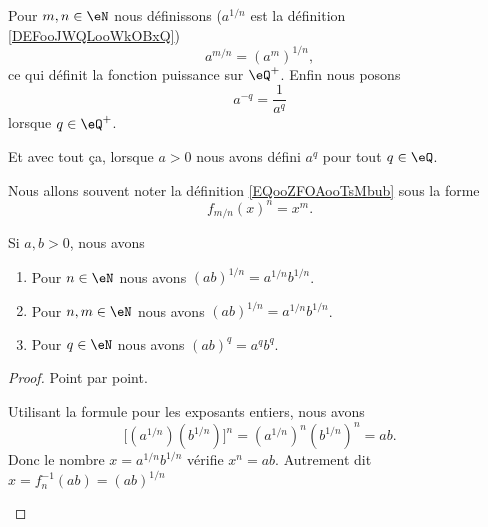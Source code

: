 \begin{definition}      \label{DEFooHXUFooOJTVXA}
	Pour \( m,n\in \eN\) nous définissons (\( a^{1/n}\) est la définition \ref{DEFooJWQLooWkOBxQ})
	\begin{equation}        \label{EQooZFOAooTsMbub}
		a^{m/n}=(a^m)^{1/n},
	\end{equation}
	ce qui définit la fonction puissance sur \( \eQ^+\). Enfin nous posons
	\begin{equation}        \label{DEFooTUCVooXikxRh}
		a^{-q}=\frac{1}{ a^q }
	\end{equation}
	lorsque \( q\in \eQ^+\).

	Et avec tout ça, lorsque \( a>0\) nous avons défini \( a^q\) pour tout \( q\in \eQ\).
\end{definition}

Nous allons souvent noter la définition \eqref{EQooZFOAooTsMbub} sous la forme
\begin{equation}        \label{EQooZIKKooVfjkZo}
	f_{m/n}(x)^n=x^m.
\end{equation}

\begin{lemma}        \label{LEMooOFPMooIEmSNA}
	Si \( a,b >0\), nous avons
	\begin{enumerate}
		\item       \label{ITEMooEFUAooYBeJza}
		      Pour \( n\in \eN\) nous avons \( (ab)^{1/n}=a^{1/n}b^{1/n}\).
		\item       \label{ITEMooHGPPooDBzWKx}
		      Pour \( n,m\in \eN\) nous avons \( (ab)^{1/n}=a^{1/n}b^{1/n}\).
		\item       \label{ITEMooUYTLooHzXwtf}
		      Pour \(q\in \eN\) nous avons \( (ab)^{q}=a^{q}b^{q}\).
	\end{enumerate}
\end{lemma}

\begin{proof}
	Point par point.
	\begin{subproof}
		Utilisant la formule pour les exposants entiers, nous avons
		\begin{equation}
			\Big[ (a^{1/n})(b^{1/n}) \Big]^n=(a^{1/n})^n(b^{1/n})^n=ab.
		\end{equation}
		Donc le nombre \( x=a^{1/n}b^{1/n}\) vérifie \( x^n=ab\). Autrement dit \( x=f_n^{-1}(ab)=(ab)^{1/n}\)


	\end{subproof}

\end{proof}

